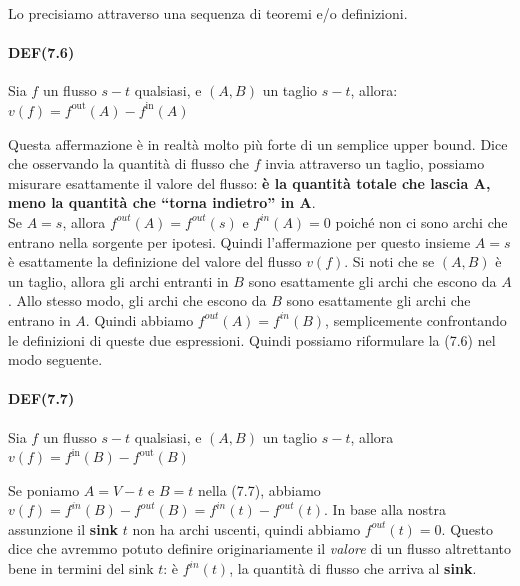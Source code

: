 Lo precisiamo attraverso una sequenza di teoremi e/o definizioni.

\paragraph{DEF(7.6)}

\begin{myblockquote}
    Sia $f$ un flusso $s-t$ qualsiasi, e $(A, B)$ un taglio $s-t$, allora:
    $
    v(f) = f^{\text{out}}(A) - f^{\text{in}}(A)
    $
\end{myblockquote}

Questa affermazione è in realtà molto più forte di un semplice upper
bound. Dice che osservando la quantità di flusso che $f$ invia
attraverso un taglio, possiamo misurare esattamente il valore del
flusso: \textbf{è la quantità totale che lascia A, meno la quantità che
``torna indietro'' in A}.\\

Se $A = {s}$, allora $f^{out}(A) = f^{out}(s)$ e $f^{in}(A) = 0$
poiché non ci sono archi che entrano nella sorgente per ipotesi. Quindi
l'affermazione per questo insieme $A = {s}$ è esattamente la
definizione del valore del flusso $v(f)$. Si noti che se $(A, B)$ è
un taglio, allora gli archi entranti in $B$ sono esattamente gli archi
che escono da $A$. Allo stesso modo, gli archi che escono da $B$
sono esattamente gli archi che entrano in $A$. Quindi abbiamo
$f^{out}(A) = f^{in}(B)$, semplicemente confrontando le definizioni di
queste due espressioni. Quindi possiamo riformulare la (7.6) nel modo
seguente.

\paragraph{DEF(7.7)}

\begin{myblockquote}
Sia $f$ un flusso $s-t$ qualsiasi, e $(A, B)$ un taglio $s-t$, allora
$
v(f) = f^{\text{in}}(B) - f^{\text{out}}(B)
$
\end{myblockquote}

Se poniamo $A = V - {t}$ e $B = {t}$ nella (7.7), abbiamo
$v(f) = f^{in}(B) - f^{out}(B) = f^{in}(t) - f^{out}(t)$. In base alla
nostra assunzione il \textbf{sink} $t$ non ha archi uscenti, quindi
abbiamo $f^{out}(t) = 0$. Questo dice che avremmo potuto definire
originariamente il \emph{valore} di un flusso altrettanto bene in
termini del sink $t$: è $f^{in}(t)$, la quantità di flusso che
arriva al \textbf{sink}.\\

